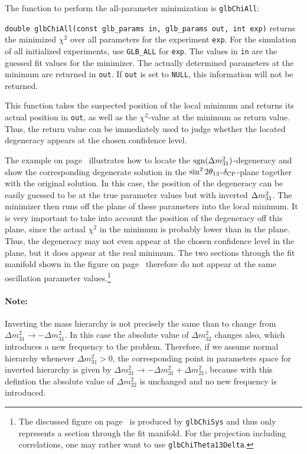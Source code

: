 The function to perform the all-parameter minimization is {\tt glbChiAll}:
\begin{function}
{\tt double glbChiAll(const glb\_params in, glb\_params out, int exp)}
  returns the minimized $\chi^2$ over all parameters for the  experiment {\tt exp}. For the simulation of all initialized experiments,
use {\tt GLB\_ALL} for {\tt exp}. The values in {\tt in} are the guessed fit values for the minimizer. The actually determined parameters at the minimum are returned in {\tt out}. If {\tt out} is set to {\tt NULL}, this information will not be returned.
\end{function}
%
This function takes the suspected position of the local minimum and returns its actual position in {\tt out}, as well as the $\chi^2$-value 
at the minimum as return value. Thus, the return value can be immediately
used to judge whether the located degeneracy appears at the chosen
confidence level.

The example on page~\pageref{ex:sgndeg} illustrates how to locate the $\mathrm{sgn}(\Delta m_{31}^2)$-degeneracy and show the corresponding degenerate solution in the $\sin^2 2 \theta_{13}$-$\delta_{\mathrm{CP}}$-plane together with the original solution.
In this case, the position of the degeneracy can be easily guessed to be 
at the true parameter values but with inverted  $\Delta m_{31}^2$.
The minimizer then runs off the plane of these parameters into the local minimum. It is very important to take into account the position of the degeneracy off this plane, since the actual $\chi^2$ in the minimum is probably lower than in the plane. Thus, the degeneracy may not even appear at the chosen confidence level in the plane, but it does appear at the real minimum. The two sections through the fit manifold shown in the figure on page~\pageref{ex:sgndeg} therefore do not appear at the same oscillation parameter values.\footnote{The discussed figure on page~\pageref{ex:sgndeg} is produced by  {\tt glbChiSys} and thus only represents a section through the fit manifold. For the projection including correlations, one may rather want to use {\tt glbChiTheta13Delta}.} 

\label{mass_ordering}
\paragraph{Note:} Inverting the mass hierarchy is not
precisely the same than to change from $\Delta m^2_{31}
\rightarrow -\Delta m^2_{31}$.
In this case the absolute value of $\Delta m^2_{32}$ changes also, which
introduces a new frequency to the problem. Therefore, if we assume
normal hierarchy  whenever $\Delta m^2_{31}>0$, the corresponding
point in parameters space for inverted hierarchy is given by $\Delta 
m^2_{31}\rightarrow - \Delta m^2_{31} + \Delta m^2_{21}$, because
with this defintion the absolute value of  $\Delta m^2_{32}$ is unchanged
and no new frequency is introduced.\\

